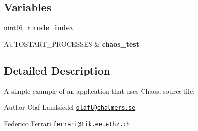 \subsection*{Variables}
\begin{DoxyCompactItemize}
\item 
\hypertarget{group__chaos-test-scheduler_gad10cfcf615471ef84ddb45e687aabf11}{uint16\-\_\-t {\bfseries node\-\_\-index}}\label{group__chaos-test-scheduler_gad10cfcf615471ef84ddb45e687aabf11}

\item 
\hypertarget{group__chaos-test-init_ga303eedf8ef9ff46e60b1d092b069b705}{A\-U\-T\-O\-S\-T\-A\-R\-T\-\_\-\-P\-R\-O\-C\-E\-S\-S\-E\-S \& {\bfseries chaos\-\_\-test}}\label{group__chaos-test-init_ga303eedf8ef9ff46e60b1d092b069b705}

\end{DoxyCompactItemize}


\subsection{Detailed Description}
\begin{DoxyVerb}    A simple example of an application that uses Chaos, source file.
\end{DoxyVerb}


\begin{DoxyAuthor}{Author}
Olaf Landsiedel \href{mailto:olafl@chalmers.se}{\tt olafl@chalmers.\-se} 

Federico Ferrari \href{mailto:ferrari@tik.ee.ethz.ch}{\tt ferrari@tik.\-ee.\-ethz.\-ch} 
\end{DoxyAuthor}
